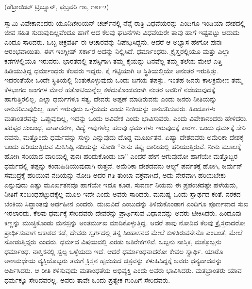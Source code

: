 \delimiter

\begin{center}
(ಡೆಟ್ರಾಯಿಟ್​ ಟ್ರಿಬ್ಯೂನ್​, ಫಬ್ರವರಿ ೧೮, ೧೮೯೪)
\end{center}

ಸ್ವಾಮಿ ವಿವೇಕಾನಂದರು ಯೂನಿಟೇರಿಯನ್​ ಚರ್ಚ್​ನಲ್ಲಿ ನೆನ್ನೆ ರಾತ್ರಿ ವಿಧವೆಯರನ್ನು ಎಂದಿಗೂ ಇಂಡಿಯಾ ದೇಶದಲ್ಲಿ ಜೀವ ಸಹಿತ ಸುಡುವುದಿಲ್ಲವೆಂದೂ ಹಾಗೆ ಆದ ಕೆಲವು ಘಟನೆಗಳು ವಿಧವೆಯರೇ ತಾವು ಹಾಗೆ ಇಷ್ಟಪಟ್ಟು ಆದುದು ಎಂದೂ ಸಾರಿದರು. ಒಬ್ಬ ಚಕ್ರವರ್ತಿ ಈ ಆಚಾರವನ್ನು ನಿಷೇಧಿಸಿದ್ದನು. ಆದರೆ ಆ ಅಭ್ಯಾಸ ಹೇಗೋ ಪುನಃ ಆರಂಭವಾಯಿತು. ಈಗ ಇಂಗ್ಲೀಷ್​ ಸರ್ಕಾರ ಅದನ್ನು ನಿಲ್ಲಿಸಿದೆ. ಧರ್ಮಾಂಧರು. ಕ್ರೈಸ್ತರಲ್ಲಿಯೂ ಮತ್ತು ಎಲ್ಲಾ ಕಡೆಗಳಲ್ಲಿಯೂ ಇರುವರು. ಭಾರತದಲ್ಲಿ ತಪಸ್ಸಿಗಾಗಿ ತಮ್ಮ ಕೈಯನ್ನು ದಿನವೆಲ್ಲ ತಮ್ಮ ತಲೆಯ ಮೇಲೆ ಎತ್ತಿ ಹಿಡಿಯುತ್ತಿದ್ದ ಧರ್ಮಾಂಧರು ಕೆಲವರು ಇದ್ದರು. ಕೈ ಗಟ್ಟಿಯಾಗಿ ಆ ಸ್ಥಿತಿಯಲ್ಲಿಯೇ ಅನಂತರ ಇರುತ್ತಿತ್ತು. ಇದರಂತೆಯೇ ಒಂದೇ ಸ್ಥಿತಿಯಲ್ಲಿ ನಿಂತುಕೊಳ್ಳುವುದು ಒಂದು ಬಗೆಯ ತಪಸ್ಸು. ಇಂತಹ ಜನರು ಕಾಲಕ್ರಮೇಣ ತಮ್ಮ ಕೆಳಭಾಗದ ಅಂಗಗಳ ಮೇಲೆ ಹತೋಟಿಯನ್ನೆಲ್ಲ ಕಳೆದುಕೊಂಡವರಾಗಿ ನಂತರ ಅವರಿಗೆ ನಡೆಯುವುದಕ್ಕೆ ಹಾಗುತ್ತಿರಲಿಲ್ಲ. ಎಲ್ಲಾ ಧರ್ಮಗಳೂ ಸತ್ಯ. ದೇವರು ಅಪ್ಪಣೆ ಮಾಡಿರುವನು ಎಂದು ಜನರು ನೀತಿಯನ್ನು ಅನುಸರಿಸುವುದಿಲ್ಲ, ಹಾಗೆ ಇರುವುದು ಒಳ್ಳೆಯದು ಎಂದು ನೀತಿಯನ್ನು ಅನುಸರಿಸುವರು. ಹಿಂದೂಗಳು ಮತಾಂತರವನ್ನು ಒಪ್ಪುವುದಿಲ್ಲ, ಇದನ್ನು ಒಂದು ಅವಿವೇಕ ಎಂದು ಭಾವಿಸುವರು. ಎಂದು ವಿವೇಕಾನಂದರು ಹೇಳಿದರು. ಪರಪ್ಪರ ಸಂಬಂಧ, ವಾತಾವರಣ, ವಿದ್ಯೆ ಇವುಗಳೆಲ್ಲ ಹಲವು ಧರ್ಮಗಳು ಇರುವುದಕ್ಕೆ ಕಾರಣ. ಒಂದು ಧರ್ಮಕ್ಕೆ ಸೇರಿ ದವನು, ಮತ್ತೊಂದು ಧರ್ಮವನ್ನು ಸುಳ್ಳು ಎನ್ನುವುದು ದೊಡ್ಡ ಮೂರ್ಖತನ. ಏಷ್ಯಾ ದೇಶದವರು ಅಮೆರಿಕಾ ದೇಶಕ್ಕೆ ಬಂದು ಹರಿಯುತ್ತಿರುವ ಮಿಸಿಸಿಪ್ಪಿ ನದಿಯನ್ನು ನೋಡಿ “ನೀನು ತಪ್ಪು ದಾರಿಯಲ್ಲಿ ಹರಿಯುತ್ತಿರುವೆ. ನೀನು ಮೂಲಕ್ಕೆ ಹೋಗಿ ಸರಿಯಾದ ದಾರಿಯಲ್ಲಿ ಪುನಃ ಹರಿದುಕೊಂಡು ಬಾ” ಎಂದರೆ ಹೇಗೆ ಆಗುವುದೋ ಹಾಗೆಯೇ ಮತ್ತೊಬ್ಬರ ಧರ್ಮದಲ್ಲಿ ತಪ್ಪನ್ನು ಕಂಡುಹಿಡಿಯುವುದಾಗಿ ರುತ್ತದೆ. ಅಮೆರಿಕಾ ದೇಶದವನು ಆಲ್ಪ್ಸ್​ ಪರ್ವತಕ್ಕೆ ಹೋಗಿ, ಜರ್ಮನ್​ ಸಮುದ್ರಕ್ಕೆ ಹರಿಯುವ ನದಿಯನ್ನು ನೋಡಿ ಅದರ ಗತಿ ತುಂಬಾ ವಕ್ರವಾಗಿದೆ, ಅದು ನೇರವಾಗಿ ಹರಿಯಬೇಕು ಎನ್ನುವುದು ಎಷ್ಟು ಮೂರ್ಖತನವೊ ಹಾಗೆಯೇ ಇದೂ ಕೂಡ. ಸುವರ್ಣ ನಿಯಮ ಈ ಪ್ರಪಂಚದಷ್ಟೇ ಹಳೆಯದು, ನೀತಿಗೆ ಸಂಬಂಧಪಟ್ಟುದಕ್ಕೆಲ್ಲ ಮೂಲ ಇದೇ ಎಂದು ಅವರು ಸಾರಿದರು. ಮನುಷ್ಯ ಒಂದು ಸ್ವಾರ್ಥದ ಕಂತೆ. ನರಕದ ಬೆಂಕಿಯ ಸಿದ್ಧಾಂತವು ಅರ್ಥಹೀನ ಎಂದರು. ದುಃಖವಿದೆ ಎಂಬುದನ್ನು ತಿಳಿದುಕೊಂಡಾಗ ಎಂದಿಗೂ ಪೂರ್ಣವಾದ ಸುಖ ಇರಲಾರದು. ಕೆಲವು ಧರ್ಮಕ್ಕೆ ಸೇರಿದವರು ದೇವರನ್ನು ಪ್ರಾರ್ಥಿಸುವ ವಿಧಾನವನ್ನು ಅವರು ಟೀಕಿಸಿದರು. ಹಿಂದೂವು ಕಣ್ಣನ್ನು ಮುಚ್ಚಿಕೊಂಡು ಮನಸ್ಸನ್ನು ಅಂತರ್ಮುಖ ಮಾಡಿಕೊಳ್ಳುತ್ತಿದ್ದ. ಆದರೆ ತಾವು ನೋಡಿದ ಕೆಲವು ಕ್ರೈಸ್ತರಾದರೋ ಪ್ರಾರ್ಥಿಸುವಾಗ ಆಕಾಶದ ಕಡೆ, ದೇವರು ಸ್ವರ್ಗದಲ್ಲಿ ತನ್ನ ಸಿಂಹಾಸನದ ಮೇಲೆ ಕುಳಿತಿರುವನೇನೊ ಎಂಬಂತೆ, ಮೇಲೆ ನೋಡುತ್ತಿದ್ದರು ಎಂದರು. ಧರ್ಮದ ವಿಷಯದಲ್ಲಿ ಎರಡು ಅತಿರೇಕಗಳಿವೆ. ಒಬ್ಬನು ನಾಸ್ತಿಕ, ಮತ್ತೊಬ್ಬನು ಧರ್ಮಾಂಧ. ನಾಸ್ತಿಕನಲ್ಲಿ ಸ್ವಲ್ಪ ಒಳ್ಳೆಯದು ಇದೆ. ಆದರೆ ಧರ್ಮಾಂಧನಾದರೋ ಕೇವಲ ಸ್ವಾರ್ಥಿ. ಯಾರೊ ಅನಾಮಧೇಯ ವ್ಯಕ್ತಿಯೊಬ್ಬರು ತಮಗೆ ಕ್ರಿಸ್ತನ ಹೃದಯದ ಚಿತ್ರವನ್ನು ಕಳುಹಿಸಿದ್ದಕ್ಕೆ ಅವರು ಧನ್ಯವಾದವನ್ನು ಅರ್ಪಿಸಿದರು. ಆ ರೀತಿ ಕಳಿಸುವುದು ಮತಾಂಧತೆಯ ಅಭಿವ್ಯಕ್ತಿ ಎಂದು ಅವರು ಭಾವಿಸಿದರು. ಮತಭ್ರಾಂತರು ಯಾವ ಧರ್ಮಕ್ಕೂ ಸೇರಿದವರಲ್ಲ. ಅವರು ತಾವೇ ಒಂದು ಪ್ರತ್ಯೇಕ ಗುಂಪಿಗೆ ಸೇರಿದವರು.


